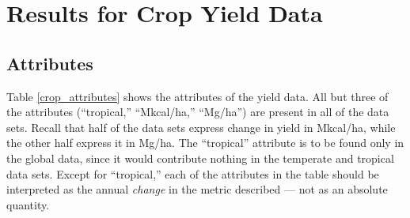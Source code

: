 \documentclass[12pt,twoside]{article}
\begin{document}
\section{Results for Crop Yield Data}
\subsection{Attributes}
Table \ref{crop_attributes} shows the attributes of the yield data. All but three of the attributes (``tropical,'' ``Mkcal/ha,'' ``Mg/ha'') are present in all of the data sets. Recall that half of the data sets express change in yield in Mkcal/ha, while the other half express it in Mg/ha. The ``tropical'' attribute is to be found only in the global data, since it would contribute nothing in the temperate and tropical data sets. Except for ``tropical,'' each of the attributes in the table should be interpreted as the annual \emph{change} in the metric described --- not as an absolute quantity. 
\end{document}
